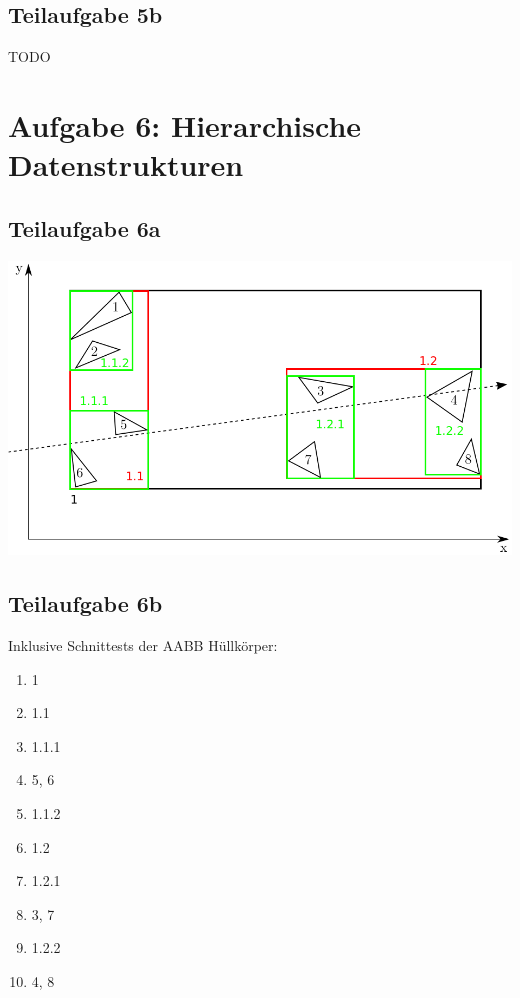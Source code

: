 \documentclass[a4paper]{scrartcl}
\begin{document}
\subsection*{Teilaufgabe 5b}
TODO

\section*{Aufgabe 6: Hierarchische Datenstrukturen}
\subsection*{Teilaufgabe 6a}
\includegraphics*[width=0.8\linewidth, keepaspectratio]{6a.png}

\subsection*{Teilaufgabe 6b}
Inklusive Schnittests der AABB Hüllkörper:

\begin{enumerate}
    \item 1
    \item 1.1
    \item 1.1.1
    \item 5, 6
    \item 1.1.2
    \item 1.2
    \item 1.2.1
    \item 3, 7
    \item 1.2.2
    \item 4, 8
\end{enumerate}
\end{document}
